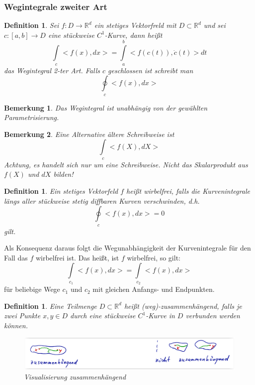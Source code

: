 \documentclass[12pt,a4paper]{report}%
\newtheorem{definition}[satz]{Definition}
\newtheorem{bem}{Bemerkung}[section]
\numberwithin{equation}{section}
\newcommand{\R}{\mathbb{R}} %
\numberwithin{equation}{subsection}
\begin{document}
		\subsubsection{Wegintegrale zweiter Art}
		\begin{definition}
		  Sei $f: D\rightarrow \R^d$ ein stetiges Vektorfreld mit $D\subset \R^d$ und sei $c:[a,b] \rightarrow D$ eine stückweise $C^1$-Kurve, dann heißt 
		  \begin{equation}
		    \int\limits_c <f(x), dx> = \int\limits_a^b <f\left(c(t)\right), \dot{c}(t)>dt
		  \end{equation}
		  das Wegintegral 2-ter Art. Falls $c$ geschlossen ist schreibt man
		  \begin{equation}
		    \oint\limits_c <f(x), dx>
		  \end{equation}
		\end{definition}
		\begin{bem}
		  Das Wegintegral ist unabhängig von der gewählten Parametrisierung.
		\end{bem}
		\begin{bem}
		  Eine Alternative ältere Schreibweise ist
		  \begin{equation*}
		    \int\limits_c <f(X),dX>
		  \end{equation*}
		  Achtung, es handelt sich nur um eine Schreibweise. Nicht das Skalarprodukt aus $f(X)$ und $dX$ bilden!
		\end{bem}
		\begin{definition}
  		Ein stetiges Vektorfeld $f$ heißt wirbelfrei, falls die Kurvenintegrale längs aller stückweise stetig diffbaren Kurven verschwinden, d.h.
  		\begin{equation}
  		  \oint\limits_c <f(x), dx> = 0
  		\end{equation}
  		gilt.
		\end{definition}
		Als Konsequenz daraus folgt die Wegunabhängigkeit der Kurvenintegrale für den Fall das $f$ wirbelfrei ist. Das heißt, ist $f$ wirbelfrei, so gilt:
		\begin{equation}
		  \int\limits_{c_1} <f(x),dx> = \int\limits_{c_2} <f(x),dx>
		\end{equation}
		für beliebige Wege $c_1$ und $c_2$ mit gleichen Anfangs- und Endpunkten.
		\begin{definition}
		  Eine Teilmenge $D \subset \R^d$ heißt (weg)-zusammenhängend, falls je zwei Punkte $x,y \in D$ durch eine stückweise $C^1$-Kurve in $D$ verbunden werden können.
		  \begin{figure}[H] 
			  \centering
			  \includegraphics[width=0.8\linewidth]{zusammenhaengend.png}
			  \caption{Visualisierung zusammenhängend \protect\cite{HM12}}
			  \label{fig:zusammenhängend}
		  \end{figure}
		\end{definition}
\end{document}
